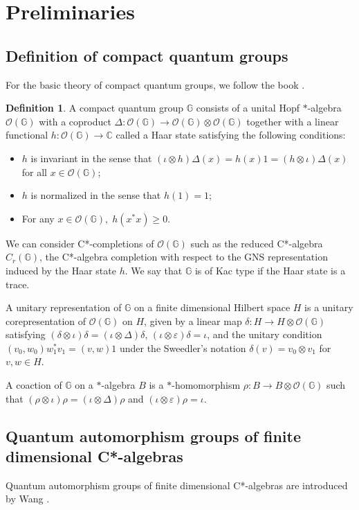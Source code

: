 \documentclass[12pt]{amsart}
\theoremstyle{plain} %
\theoremstyle{definition}
\newtheorem{definition}[equation]{Definition}
\theoremstyle{remark}
\begin{document}
\section{Preliminaries}
\subsection{Definition of compact quantum groups}
 For the basic theory of compact quantum groups, we follow the book \cite{NT13}.

\begin{definition}
A compact quantum group $\mathbb{G}$ consists of a unital Hopf $*$-algebra $\mathcal{O}({\mathbb{G}})$ with a coproduct $\Delta: \mathcal{O}({\mathbb{G}})\to\mathcal{O}({\mathbb{G}})\otimes\mathcal{O}({\mathbb{G}})$ together with a linear functional $h:\mathcal{O}({\mathbb{G}})\to \mathbb{C}$ called a Haar state satisfying the following conditions:
\begin{itemize}
\item $h$ is invariant in the sense that $(\iota\otimes h)\Delta(x)=h(x)1=(h\otimes\iota)\Delta(x)$ for all $x\in\mathcal{O}(\mathbb{G})$;
\item $h$ is normalized in the sense that $h(1)=1$;
\item For any $x\in \mathcal{O}(\mathbb{G}), \; h(x^*x)\geq0$.
\end{itemize}
\end{definition}

We can consider C*-completions of $\mathcal{O}(\mathbb{G})$ such as the reduced C*-algebra $C_r(\mathbb{G})$, the C*-algebra completion with respect to the GNS representation induced by the Haar state $h$.
We say that $\mathbb{G}$ is of Kac type if the Haar state is a trace.

A unitary representation of $\mathbb{G}$ on a finite dimensional Hilbert space $H$ is a unitary corepresentation of $\mathcal{O}(\mathbb{G})$ on $H$, given by a linear map $\delta: H\to H\otimes \mathcal{O}(\mathbb{G})$ satisfying $(\delta\otimes\iota)\delta=(\iota\otimes\Delta)\delta$, $(\iota\otimes\varepsilon)\delta=\iota$, and the unitary condition $(v_0, w_0)w_1^*v_1=(v, w) 1$ under the Sweedler's notation $\delta(v)=v_0\otimes v_1$ for $v, w\in H$.

A coaction of $\mathbb{G}$ on a $*$-algebra $B$ is a $*$-homomorphism $\rho:B\to B\otimes \mathcal{O}(\mathbb{G})$ such that $(\rho\otimes \iota)\rho=(\iota\otimes\Delta)\rho$ and $(\iota\otimes\varepsilon)\rho=\iota$.

\subsection{Quantum automorphism groups of finite dimensional C*-algebras}
Quantum automorphism groups of finite dimensional C*-algebras are introduced by Wang \cite[Definition 2.3]{Wan98}.
\end{document}
